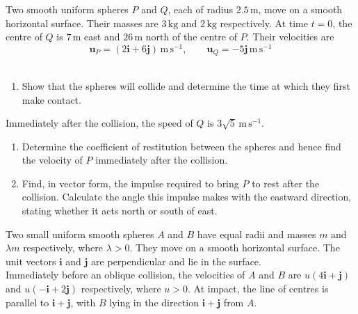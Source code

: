\documentclass[leqno]{article}
\begin{document}
\begin{enumerate}[
  label=\textbf{\arabic*.},
  leftmargin=*,
  topsep=0pt,
  partopsep=0pt,
  parsep=0pt
]
Two smooth uniform spheres $P$ and $Q$, each of radius $2.5\,\mathrm{m}$, move on a smooth horizontal surface. Their masses are $3\,\mathrm{kg}$ and $2\,\mathrm{kg}$ respectively. At time $t=0$, the centre of $Q$ is $7\,\mathrm{m}$ east and $26\,\mathrm{m}$ north of the centre of $P$. Their velocities are
\[
\mathbf{u}_P=(2\mathbf{i}+6\mathbf{j})\,\mathrm{m\,s^{-1}},\qquad \mathbf{u}_Q=-5\mathbf{j}\,\mathrm{m\,s^{-1}}
\] \\
\begin{enumerate}[label=\textbf{(\alph*)}]
\item Show that the spheres will collide and determine the time at which they first make contact.  \\
\end{enumerate}
Immediately after the collision, the speed of $Q$ is $3\sqrt{5}\,\mathrm{m\,s^{-1}}$. \\
\begin{enumerate}[label=\textbf{(\alph*)}, resume]
\item Determine the coefficient of restitution between the spheres and hence find the velocity of $P$ immediately after the collision.  \\
\item Find, in vector form, the impulse required to bring $P$ to rest after the collision. Calculate the angle this impulse makes with the eastward direction, stating whether it acts north or south of east.  \\
\end{enumerate}

\newpage

\questionitem

Two small uniform smooth spheres $A$ and $B$ have equal radii and masses $m$ and $\lambda m$ respectively, where $\lambda>0$. They move on a smooth horizontal surface. The unit vectors $\mathbf{i}$ and $\mathbf{j}$ are perpendicular and lie in the surface. \\

Immediately before an oblique collision, the velocities of $A$ and $B$ are $u(4\mathbf{i}+\mathbf{j})$ and $u(-\mathbf{i}+2\mathbf{j})$ respectively, where $u>0$. At impact, the line of centres is parallel to $\mathbf{i}+\mathbf{j}$, with $B$ lying in the direction $\mathbf{i}+\mathbf{j}$ from $A$. \\


\end{enumerate}
\end{document}
